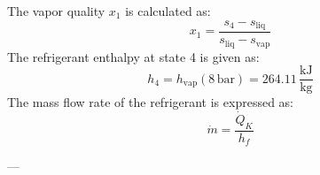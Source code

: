 The vapor quality \( x_1 \) is calculated as:  
\[
x_1 = \frac{s_4 - s_{\text{liq}}}{s_{\text{liq}} - s_{\text{vap}}}
\]  
The refrigerant enthalpy at state 4 is given as:  
\[
h_4 = h_{\text{vap}}(8 \, \text{bar}) = 264.11 \, \frac{\text{kJ}}{\text{kg}}
\]  
The mass flow rate of the refrigerant is expressed as:  
\[
\dot{m} = \frac{\dot{Q}_K}{h_f}
\]  

---
